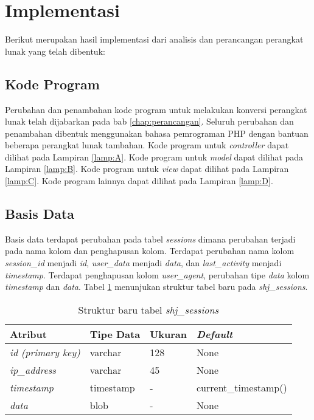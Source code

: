 \section{Implementasi}
Berikut merupakan hasil implementasi dari analisis dan perancangan perangkat lunak yang telah dibentuk:
\subsection{Kode Program}
Perubahan dan penambahan kode program untuk melakukan konversi perangkat lunak telah dijabarkan pada bab \ref{chap:perancangan}. Seluruh perubahan dan penambahan dibentuk menggunakan bahasa pemrograman PHP dengan bantuan beberapa perangkat lunak tambahan. Kode program untuk \textit{controller} dapat dilihat pada Lampiran \ref{lamp:A}. Kode program untuk \textit{model} dapat dilihat pada Lampiran \ref{lamp:B}. Kode program untuk \textit{view} dapat dilihat pada Lampiran \ref{lamp:C}. Kode program lainnya dapat dilihat pada Lampiran \ref{lamp:D}.

\subsection{Basis Data}
Basis data terdapat perubahan pada tabel \textit{sessions} dimana perubahan terjadi pada nama kolom dan penghapusan kolom. Terdapat perubahan nama kolom \textit{session\_id} menjadi \textit{id}, \textit{user\_data} menjadi \textit{data}, dan \textit{last\_activity} menjadi \textit{timestamp}. Terdapat penghapusan kolom \textit{user\_agent}, perubahan tipe \textit{data} kolom \textit{timestamp} dan \textit{data}. Tabel \ref{tab:shjsessionbab5} menunjukan struktur tabel baru pada \textit{shj\_sessions}.

\begin{table}[H]
\centering
\caption{Struktur baru tabel \textit{shj\_sessions}}
\label{tab:shjsessionbab5}
\begin{tabular}{|l|l|l|l|}
\hline
\textbf{Atribut}          & \textbf{Tipe Data} & \textbf{Ukuran} & \textit{\textbf{Default}} \\ \hline
\textit{id (primary key)} & varchar            & 128             & None                      \\ \hline
\textit{ip\_address}       & varchar            & 45              & None                      \\ \hline
\textit{timestamp}        & timestamp          & -               & current\_timestamp()       \\ \hline
\textit{data}             & blob               & -               & None                      \\ \hline
\end{tabular}
\end{table}

